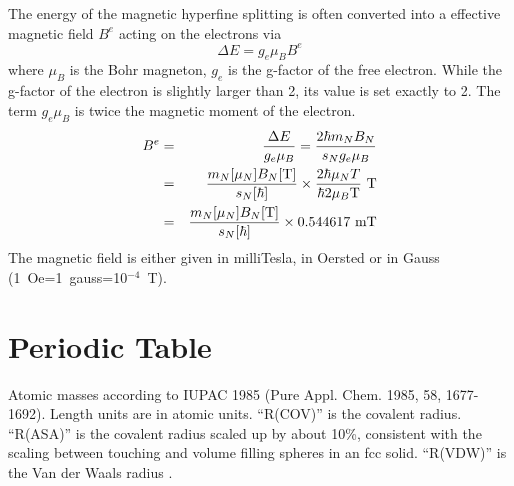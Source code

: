 \documentclass[final,12pt]{article}
\begin{document}
The energy of the magnetic hyperfine splitting is often converted into
a effective magnetic field $B^e$ acting on the electrons via
\begin{displaymath}
\Delta E=g_e\mu_B B^e
\end{displaymath}
where $\mu_B$ is the Bohr magneton, $g_e$ is the g-factor of the free
electron. While the g-factor of the electron is slightly larger than
2, its value is set exactly to 2. The term $g_e\mu_B$ is twice the
magnetic moment of the electron. 
\begin{eqnarray*}
B^e&=&\frac{\Delta E}{g_e\mu_B}=\frac{2\hbar m_N B_N}{s_N g_e\mu_B}
\\
&=&\frac{m_N[\mu_N]B_N[{\rm T}]}{s_N[\hbar]}\times 
\frac{2\hbar\mu_N T}{\hbar 2\mu_B {\rm T}}\ {\rm T} 
\\
&=& \frac{m_N[\mu_N]B_N[{\rm T}]}{s_N[\hbar]}\times 0.544617\ {\rm mT}
\end{eqnarray*}
The magnetic field is either given in
milliTesla, in Oersted or in Gauss (1~Oe=1~gauss=10$^{-4}$~T).

\newpage
\section{Periodic Table}
Atomic masses according to IUPAC 1985 (Pure Appl. Chem. 1985, 58,
1677-1692). Length units are in atomic units. ``R(COV)'' is the covalent radius.
``R(ASA)'' is the covalent radius scaled up by about 10\%, consistent
with the scaling between touching and volume filling spheres in an fcc
solid. ``R(VDW)'' is the Van der Waals radius \cite{UFF}.
\end{document}
